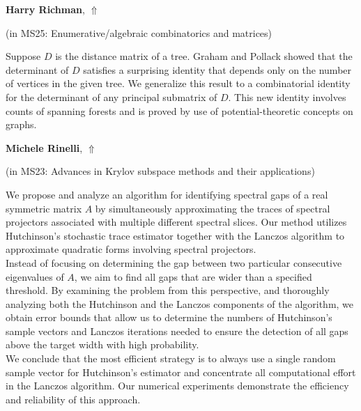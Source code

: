 \documentclass[ILAS2025-program.tex]{subfiles}
\begin{document}
\hypertarget{down0182}{}\begin{ilasabstract}
    
\textbf{Harry Richman},  \hfill \hyperlink{up0182}{$\Uparrow$}
    
    
(in {\color{mstitle}MS25: Enumerative/algebraic combinatorics and matrices})
        
\mtskip
    Suppose $D$ is the distance matrix of a tree. 
Graham and Pollack showed that the determinant of $D$ satisfies a surprising identity that depends only on the number of vertices in the given tree.
We generalize this result to a combinatorial identity for the determinant of any principal submatrix of $D$.
This new identity involves counts of spanning forests and is proved by use of potential-theoretic concepts on graphs.

\end{ilasabstract}
    

\hypertarget{down0193}{}\begin{ilasabstract}
    
\textbf{Michele Rinelli},  \hfill \hyperlink{up0193}{$\Uparrow$}
    
    
(in {\color{mstitle}MS23: Advances in Krylov subspace methods and their applications})
        
\mtskip
    We propose and analyze an algorithm for identifying spectral gaps of a real symmetric matrix $A$ by simultaneously approximating the traces of spectral projectors associated with multiple different spectral slices. Our method utilizes Hutchinson's stochastic trace estimator together with the Lanczos algorithm to approximate quadratic forms involving spectral projectors.\\
Instead of focusing on determining the gap between two particular consecutive eigenvalues of $A$, we aim to find all gaps that are wider than a specified threshold. By examining the problem from this perspective, and thoroughly analyzing both the Hutchinson and the Lanczos components of the algorithm, we obtain error bounds that allow us to determine the numbers of Hutchinson's sample vectors and Lanczos iterations needed to ensure the detection of all gaps above the target width with high probability.\\
We conclude that the most efficient strategy is to always use a single random sample vector for Hutchinson's estimator and concentrate all computational effort in the Lanczos algorithm. Our numerical experiments demonstrate the efficiency and reliability of this approach.

\end{ilasabstract}
    
\end{document}
